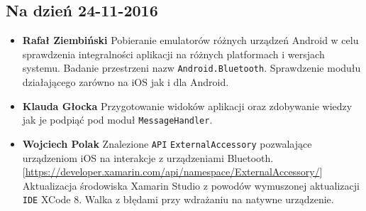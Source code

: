 \documentclass[a4paper, titlepage]{article}
\begin{document}
\subsection{Na dzień 24-11-2016}
\label{sec:org1f7d600}
\begin{itemize}
\item \textbf{Rafał Ziembiński}
Pobieranie emulatorów różnych urządzeń Android w celu sprawdzenia integralności aplikacji na różnych platformach i wersjach systemu.
Badanie przestrzeni nazw \texttt{Android.Bluetooth}. Sprawdzenie modułu działającego zarówno na iOS jak i dla Android.
\item \textbf{Klauda Głocka}
Przygotowanie widoków aplikacji oraz zdobywanie wiedzy jak je podpiąć pod moduł \texttt{MessageHandler}.
\item \textbf{Wojciech Polak}
Znalezione \texttt{API} \texttt{ExternalAccessory} pozwalające urządzeniom iOS na interakcje z urządzeniami Bluetooth.
[\url{https://developer.xamarin.com/api/namespace/ExternalAccessory/}]
Aktualizacja środowiska Xamarin Studio z powodów wymuszonej aktualizacji \texttt{IDE} XCode 8.
Walka z błędami przy wdrażaniu na natywne urządzenie.
\end{itemize}
\end{document}
